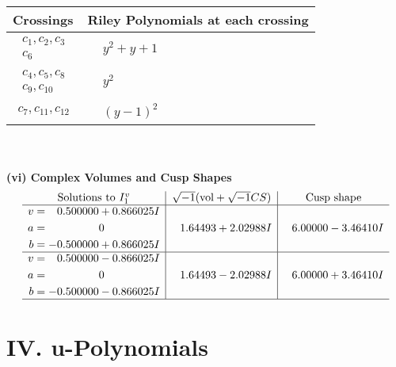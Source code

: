 \documentclass[1p]{elsarticle_modified}
\theoremstyle{definition}
\newcommand{\I}{\sqrt{-1}}
\begin{document}
\begin{tabular}{m{50pt}|m{274pt}}
Crossings & \hspace{64pt}Riley Polynomials at each crossing \\
\hline $$\begin{aligned}c_{1},c_{2},c_{3}\\c_{6}\end{aligned}$$&$\begin{aligned}
&y^2+y+1
\end{aligned}$\\
\hline $$\begin{aligned}c_{4},c_{5},c_{8}\\c_{9},c_{10}\end{aligned}$$&$\begin{aligned}
&y^2
\end{aligned}$\\
\hline $$\begin{aligned}c_{7},c_{11},c_{12}\end{aligned}$$&$\begin{aligned}
&(y-1)^2
\end{aligned}$\\
\hline
\end{tabular}\\~\\
\newpage\flushleft \textbf{(vi) Complex Volumes and Cusp Shapes}
$$\begin{array}{c|c|c}  
\text{Solutions to }I^v_{1}& \I (\text{vol} + \sqrt{-1}CS) & \text{Cusp shape}\\
 \hline 
\begin{aligned}
v &= \phantom{-}0.500000 + 0.866025 I \\
a &= \phantom{-0.000000 } 0 \\
b &= -0.500000 + 0.866025 I\end{aligned}
 & \phantom{-}1.64493 + 2.02988 I & \phantom{-}6.00000 - 3.46410 I \\ \hline\begin{aligned}
v &= \phantom{-}0.500000 - 0.866025 I \\
a &= \phantom{-0.000000 } 0 \\
b &= -0.500000 - 0.866025 I\end{aligned}
 & \phantom{-}1.64493 - 2.02988 I & \phantom{-}6.00000 + 3.46410 I\\
 \hline 
 \end{array}$$\newpage
\newpage\renewcommand{\arraystretch}{1}
\centering \section*{ IV. u-Polynomials}
\end{document}
